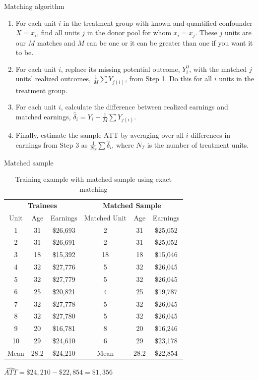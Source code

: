 \documentclass{beamer}
\begin{document}
\begin{frame}{Matching algorithm}

\begin{enumerate}
\item For each unit $i$ in the treatment group with known and quantified confounder $X=x_i$, find all units $j$ in the donor pool for whom $x_i=x_j$. These $j$ units are our $M$ matches and $M$ can be one or it can be greater than one if you want it to be.
\item For each unit $i$, replace its missing potential outcome, $Y^0_i$, with the matched $j$ units' realized outcomes, $\frac{1}{M} \sum {Y}_{j(i)}$, from Step 1. Do this for all $i$ units in the treatment group.
\item For each unit $i$, calculate the difference between realized earnings and matched earnings, $\widehat{\delta}_i=Y_i - \frac{1}{M} \sum {Y}_{j(i)}$.
\item Finally, estimate the sample ATT by averaging over all $i$ differences in earnings from Step 3 as $\frac{1}{N_T} \sum \widehat{\delta}_i$, where $N_T$ is the number of treatment units.
\end{enumerate}

\end{frame}



\begin{frame}{Matched sample}

\begin{table}[htb]\small{}
\caption{Training example with matched sample using exact matching}
\centering
\begin{tabular}{ccc|ccc}
\toprule
	\multicolumn{3}{c}{\textbf{Trainees}}&
	\multicolumn{3}{c}{\textbf{Matched Sample}}\\
	\multicolumn{1}{c}{Unit}&
	\multicolumn{1}{c}{Age}&
	\multicolumn{1}{c}{Earnings}&
	\multicolumn{1}{c}{Matched Unit}&
	\multicolumn{1}{c}{Age}&
	\multicolumn{1}{c}{Earnings}\\
\midrule
1&	31&	\$26,693&	2&	31&	\$25,052 \\
2&	31&	\$26,691&	2&	31&	\$25,052 \\
3&	18&	\$15,392&	18&	18&	\$15,046 \\
4&	32&	\$27,776&	5&	32&	\$26,045 \\
5&	32&	\$27,779&	5&	32&	\$26,045 \\
6&	25&	\$20,821&	4&	25&	\$19,787 \\
7&	32&	\$27,778&	5&	32&	\$26,045 \\
8&	32&	\$27,780&	5&	32&	\$26,045 \\
9&	20&	\$16,781&	8&	20&	\$16,246 \\
10&	29&	\$24,610&	6&	29&	\$23,178 \\
\midrule
Mean&	28.2&	\$24,210&	Mean&	28.2&	\$22,854 \\
\bottomrule
\end{tabular}
\end{table}
\footnotesize
$\widehat{ATT} = \$24,210 - \$22,854 = \$1,356$


\end{frame}
\end{document}
